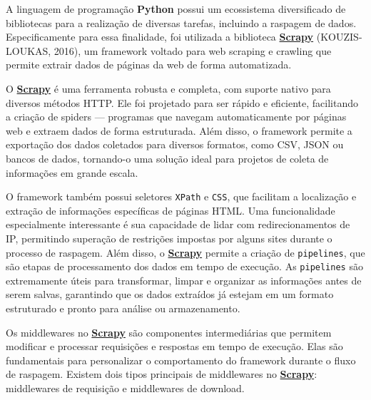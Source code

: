\documentclass[
  12pt,
  a4paper,
]{scrreprt}
\begin{document}
\vspace{12pt}

A linguagem de programação \textbf{Python} possui um ecossistema
diversificado de bibliotecas para a realização de diversas tarefas,
incluindo a raspagem de dados. Especificamente para essa finalidade, foi
utilizada a biblioteca
\href{https://docs.scrapy.org/en/latest}{\textbf{Scrapy}}
(KOUZIS-LOUKAS, 2016), um framework voltado para web scraping e crawling
que permite extrair dados de páginas da web de forma automatizada.

\vspace{12pt}

O \href{https://docs.scrapy.org/en/latest}{\textbf{Scrapy}} é uma
ferramenta robusta e completa, com suporte nativo para diversos métodos
HTTP. Ele foi projetado para ser rápido e eficiente, facilitando a
criação de spiders --- programas que navegam automaticamente por páginas
web e extraem dados de forma estruturada. Além disso, o framework
permite a exportação dos dados coletados para diversos formatos, como
CSV, JSON ou bancos de dados, tornando-o uma solução ideal para projetos
de coleta de informações em grande escala.

\vspace{12pt}

O framework também possui seletores \texttt{XPath} e \texttt{CSS}, que
facilitam a localização e extração de informações específicas de páginas
HTML. Uma funcionalidade especialmente interessante é sua capacidade de
lidar com redirecionamentos de IP, permitindo superação de restrições
impostas por alguns sites durante o processo de raspagem. Além disso, o
\href{https://docs.scrapy.org/en/latest}{\textbf{Scrapy}} permite a
criação de \texttt{pipelines}, que são etapas de processamento dos dados
em tempo de execução. As \texttt{pipelines} são extremamente úteis para
transformar, limpar e organizar as informações antes de serem salvas,
garantindo que os dados extraídos já estejam em um formato estruturado e
pronto para análise ou armazenamento.

\vspace{12pt}

Os middlewares no
\href{https://docs.scrapy.org/en/latest}{\textbf{Scrapy}} são
componentes intermediárias que permitem modificar e processar
requisições e respostas em tempo de execução. Elas são fundamentais para
personalizar o comportamento do framework durante o fluxo de raspagem.
Existem dois tipos principais de middlewares no
\href{https://docs.scrapy.org/en/latest}{\textbf{Scrapy}}: middlewares
de requisição e middlewares de download.
\end{document}
